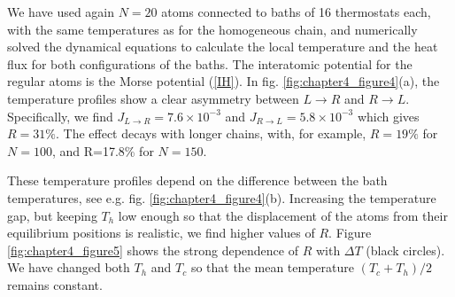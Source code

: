 We have used again $N=20$ atoms connected to baths of 16 thermostats each, with the same temperatures as for the homogeneous chain, and numerically solved the dynamical equations
to calculate the local temperature and the heat flux for both configurations of the baths. The interatomic potential for the regular atoms is the Morse potential (\ref{IH}).
In fig. \ref{fig:chapter4_figure4}(a), the temperature profiles show a clear asymmetry between ${L\rightarrow R}$ and ${R\rightarrow L}$. Specifically, we find $J_{L\rightarrow R}=7.6 \times 10^{-3}$ and $J_{R\rightarrow L}=5.8 \times 10^{-3}$ which gives
$R=31\%$. The effect decays with longer chains,  with, for example, $R=19\%$ for $N=100$, and R=17.8\% for $N=150$.

These temperature profiles depend on the difference between the bath temperatures, see e.g. fig. \ref{fig:chapter4_figure4}(b). Increasing the temperature gap, but  keeping $T_h$ low enough so that the displacement of the atoms from their equilibrium positions is realistic, we find higher values of $R$. Figure \ref {fig:chapter4_figure5} shows the strong dependence of $R$ with $\Delta T$ (black circles). We have changed both $T_h$ and $T_c$ so that the mean temperature $(T_c+T_h)/2$ remains constant.





